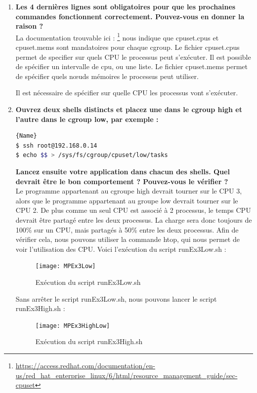 \documentclass[
	a4paper, %
	10pt, %
]{CSUniSchoolLabReport}
\begin{document}
\begin{enumerate}[label=\textbf{\arabic*}]
	\item \textbf{Les 4 dernières lignes sont obligatoires pour que les prochaines commandes fonctionnent correctement. Pouvez-vous en donner la raison ?}\\
	La documentation trouvable ici : \footnote{\href{https://access.redhat.com/documentation/en-us/red_hat_enterprise_linux/6/html/resource_management_guide/sec-cpuset}{https://access.redhat.com/documentation/en-us/red\_hat\_enterprise\_linux/6/html/resource\_management\_guide/sec-cpuset}}
	nous indique que cpuset.cpus et cpuset.mems sont mandatoires pour chaque cgroup.
	Le fichier cpuset.cpus permet de specifier sur quels CPU le processus peut s'ex\'ecuter. Il est possible de sp\'ecifier un intervalle de cpu, ou une liste.
	Le fichier cpuset.mems permet de sp\'ecifier quels n\oe{}uds m\'emoires le processus peut utiliser.
	
	
	Il est n\'ecessaire de sp\'ecifier sur quelle CPU les processus vont s'ex\'ecuter.
	\item \textbf{Ouvrez deux shells distincts et placez une dans le cgroup high et l’autre dans le cgroup low, par exemple :}\\
\begin{lstlisting}[language=bash, firstnumber=1]{Name}
$ ssh root@192.168.0.14
$ echo $$ > /sys/fs/cgroup/cpuset/low/tasks
\end{lstlisting}
\textbf{Lancez ensuite votre application dans chacun des shells. Quel devrait être le bon comportement ? Pouvez-vous le vérifier ?}\\
Le programme appartenant au cgroupe high devrait tourner sur le CPU 3, alors que le programme appartenant au groupe low devrait tourner sur le CPU 2.
De plus comme un seul CPU est associé \`a 2 processus, le temps CPU devrait \^etre partagé entre les deux processus. La charge sera donc toujours de 100\% sur un CPU, mais partagés \`a 50\% entre les deux processus.
Afin de v\'erifier cela, nous pouvons utiliser la commande htop, qui nous permet de voir l'utilisation des CPU.
Voici l'ex\'ecution du script runEx3Low.sh :
\begin{figure}[H]
	\centering
	\texttt{[image: MPEx3Low]}
	\caption{Ex\'ecution du script runEx3Low.sh}
	\label{fig:MPEx3Low}
\end{figure}
Sans arr\^eter le script runEx3Low.sh, nous pouvons lancer le script runEx3High.sh :
\begin{figure}[H]
	\centering
	\texttt{[image: MPEx3HighLow]}
	\caption{Ex\'ecution du script runEx3High.sh}
	\label{fig:MPEx3High}
\end{figure}


\end{enumerate}
\end{document}
